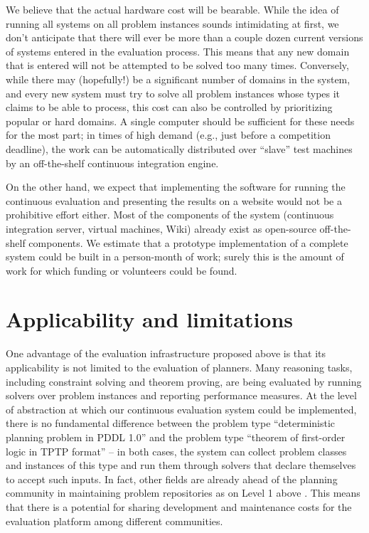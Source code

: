 We believe that the actual hardware cost will be bearable.  While the
idea of running all systems on all problem instances sounds
intimidating at first, we don't anticipate that there will ever be
more than a couple dozen current versions of systems entered in the
evaluation process.  This means that any new domain that is entered
will not be attempted to be solved too many times.  Conversely, while
there may (hopefully!) be a significant number of domains in the
system, and every new system must try to solve all problem instances
whose types it claims to be able to process, this cost can also be
controlled by prioritizing popular or hard domains.  A single computer
should be sufficient for these needs for the most part; in times of
high demand (e.g., just before a competition deadline), the work can
be automatically distributed over ``slave'' test machines by an
off-the-shelf continuous integration engine.

On the other hand, we expect that implementing the software for
running the continuous evaluation and presenting the results on a
website would not be a prohibitive effort either.  Most of the
components of the system (continuous integration server, virtual
machines, Wiki) already exist as open-source off-the-shelf
components.  We estimate that a prototype implementation of a complete
system could be built in a person-month of work; surely this is the
amount of work for which funding or volunteers could be found.






\section{Applicability and limitations}

One advantage of the evaluation infrastructure proposed above is that
its applicability is not limited to the evaluation of planners.
Many reasoning tasks, including constraint solving and theorem
proving, are being evaluated by running solvers over problem instances
and reporting performance measures.  At the level of abstraction at
which our continuous evaluation system could be implemented, there is
no fundamental difference between the problem type ``deterministic
planning problem in PDDL 1.0'' and the problem type ``theorem of
first-order logic in TPTP format'' -- in both cases, the system can
collect problem classes and instances of this type and run them
through solvers that declare themselves to accept such inputs.  In
fact, other fields are already ahead of the planning community in
maintaining problem repositories as on Level 1 above
\cite{SS98,csplib,Asuncion+Newman:2007}. This means that there is a
potential for sharing development and maintenance costs for the
evaluation platform among different communities.

